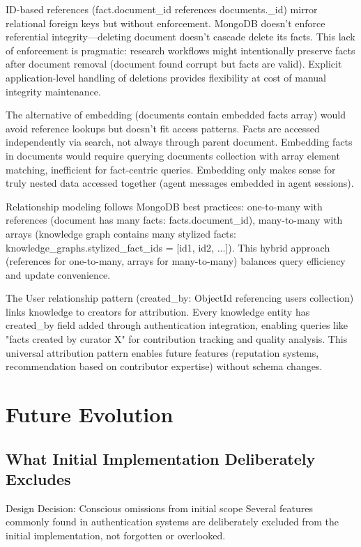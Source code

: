 \documentclass[12pt,a4paper]{article}
\begin{document}
ID-based references (fact.document\_id references documents.\_id) mirror relational foreign keys but without enforcement. MongoDB doesn't enforce referential integrity—deleting document doesn't cascade delete its facts. This lack of enforcement is pragmatic: research workflows might intentionally preserve facts after document removal (document found corrupt but facts are valid). Explicit application-level handling of deletions provides flexibility at cost of manual integrity maintenance.

The alternative of embedding (documents contain embedded facts array) would avoid reference lookups but doesn't fit access patterns. Facts are accessed independently via search, not always through parent document. Embedding facts in documents would require querying documents collection with array element matching, inefficient for fact-centric queries. Embedding only makes sense for truly nested data accessed together (agent messages embedded in agent sessions).

Relationship modeling follows MongoDB best practices: one-to-many with references (document has many facts: facts.document\_id), many-to-many with arrays (knowledge graph contains many stylized facts: knowledge\_graphs.stylized\_fact\_ids = [id1, id2, ...]). This hybrid approach (references for one-to-many, arrays for many-to-many) balances query efficiency and update convenience.

The User relationship pattern (created\_by: ObjectId referencing users collection) links knowledge to creators for attribution. Every knowledge entity has created\_by field added through authentication integration, enabling queries like "facts created by curator X" for contribution tracking and quality analysis. This universal attribution pattern enables future features (reputation systems, recommendation based on contributor expertise) without schema changes.

\section{Future Evolution}

\subsection{What Initial Implementation Deliberately Excludes}

\begin{rationale}{Design Decision: Conscious omissions from initial scope}
Several features commonly found in authentication systems are deliberately excluded from the initial implementation, not forgotten or overlooked.
\end{rationale}
\end{document}
